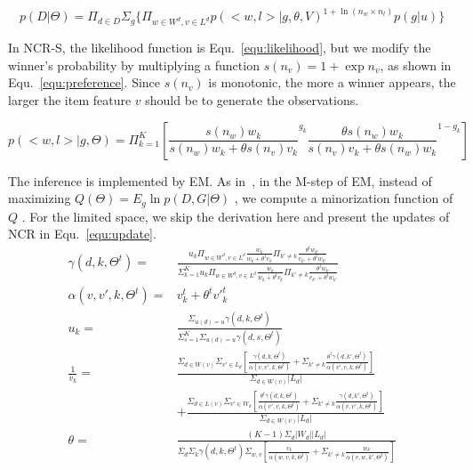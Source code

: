 \documentclass[sigconf]{acmart}
\begin{document}
\begin{equation}\label{equ:NCRM}
		p(D|\Theta)=\Pi_{d\in D} \Sigma_{g} \{ \Pi_{w\in W^d, v\in L^d} {p(<w,l>|g,\theta,V)}^{1+\ln (n_w \times n_l)} p(g|u) \}
\end{equation}

In NCR-S, the likelihood function is Equ.~\ref{equ:likelihood}, but we modify the winner's probability by multiplying a function $s(n_v)=1+\exp n_v$, as shown in Equ.~\ref{equ:preference}. Since $s(n_v)$ is monotonic, the more a winner appears, the larger the item feature $v$ should be to generate the observations. 

\begin{equation}\label{equ:preference}
 p(<w,l>|g,\Theta)  =  \Pi_{k=1}^{K}[ {\frac{s(n_w) w_k}{s(n_w) w_k+\theta s(n_v) v_k}}^{g_k} { \frac{\theta s(n_w) w_{k}}{s(n_v) v_{k}+\theta s(n_w) w_{k}}}^{1-g_k}]
\end{equation}


The inference is implemented by EM. As in~\cite{Hunter2004MM}, in the M-step of EM, instead of maximizing $Q(\Theta)=E_g \ln p(D,G|\Theta) $ , we compute a minorization function of $Q$ . For the limited space, we skip the derivation here and present the updates of NCR in Equ.~\ref{equ:update}. 
\begin{align}\label{equ:update}
\gamma(d,k,\Theta^t) =&\frac{u_k \Pi_{w \in W^d, v\in L^d} \frac{w_k}{w_k+\theta^t v_k}\Pi_{k'\neq k}\frac{\theta^t w_{k'}}{v_{k'}+\theta^t w_{k'}}}{\Sigma_{k=1}^K u_k \Pi_{w \in W^d, v\in L^d} \frac{w_k}{w_k+\theta^t v_k}\Pi_{k'\neq k}\frac{\theta^t w_{k'}}{v_{k'}+\theta^t w_{k'}}}\\\nonumber
\alpha(v,v',k,\Theta^t)=&v_k^t + \theta^t {v'}_k^t\\\nonumber
u_k = & \frac{\Sigma_{u(d)=u}\gamma(d,k,\Theta^t)}{\Sigma_{s=1}^K \Sigma_{u(d)=u}\gamma(d,s,\Theta^t)} \\\nonumber
\frac{1}{v_k}= &\frac{\Sigma_{d\in W(v)}\Sigma_{v'\in L_d} [\frac{\gamma(d,k,\Theta^t)}{ \alpha(v,v',k,\Theta^t)} +\Sigma_{k'\neq k}\frac{\theta^t\gamma(d,k',\Theta^t)}{\alpha(v',v,k,\Theta^t)}]}{\Sigma_{d\in W(v)}|L_d|}\\\nonumber
 & + \frac{\Sigma_{d\in L(v)}\Sigma_{v'\in W_d} [\frac{\theta^t \gamma(d,k,\Theta^t)}{\alpha(v',v,k,\Theta^t)}+\Sigma_{k'\neq k} \frac{\gamma(d,k',\Theta^t)}{\alpha(v,v',k,\Theta^t)}] }{\Sigma_{d\in W(v)}|L_d|}\\\nonumber
\theta = & \frac{(K-1)\Sigma_d |W_d| |L_d|}{\Sigma_d \Sigma_k \gamma(d,k,\Theta^t)\Sigma_{w,v} [\frac{v_k}{\alpha(w,v,k,\Theta^t)}+\Sigma_{k'\neq k} \frac{w_{k'}}{\alpha(v,w,k',\Theta^t)}]}
\end{align}
\end{document}

